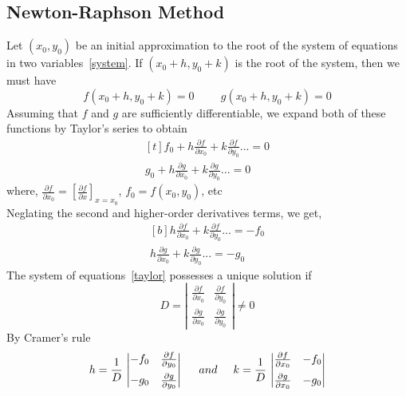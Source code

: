 \documentclass[aima203_lecturenotes_ku.tex]{subfiles}
\begin{document}
\subsection{Newton-Raphson Method}
Let $(x_0,y_0)$ be an initial approximation to the root of the system of equations in two variables~\ref{system}. If $(x_0+h, y_0+k)$ is the root of the system, then we must have
\begin{equation*}
  f(x_0+h,y_0+k) = 0 \hspace{1cm} g(x_0+h,y_0+k) = 0
\end{equation*}
Assuming that $f$ and $g$ are sufficiently differentiable, we expand both of these functions by Taylor's series to obtain
\begin{equation*}
  \begin{gathered}[t]
    f_0 +h\frac{\partial f}{\partial x_0} + k\frac{\partial f}{\partial y_0}... = 0 \\
    g_0 +h\frac{\partial g}{\partial x_0} + k\frac{\partial g}{\partial y_0}... = 0
  \end{gathered}
\end{equation*}
where, \hspace{5mm} $\displaystyle \frac{\partial f}{\partial x_0} = \left [\frac{\partial f}{\partial x} \right ] _{x=x_0}$, $f_0 = f(x_0,y_0)$, etc \\[1mm]
Neglating the second and higher-order derivatives terms, we get,
\begin{equation}
  \label{taylor}
  \begin{gathered}[b]
    h\frac{\partial f}{\partial x_0} + k\frac{\partial f}{\partial y_0}... = -f_0 \\
     h\frac{\partial g}{\partial x_0} + k\frac{\partial g}{\partial y_0}... = -g_0
  \end{gathered}
\end{equation}
The system of equations~\ref{taylor} possesses a unique solution if
$$ D =
\left \vert \begin{matrix}
  \frac{\partial f}{\partial x_0}  & \frac{\partial f}{\partial y_0} \\[2mm]
  \frac{\partial g}{\partial x_0}  & \frac{\partial g}{\partial y_0}
\end{matrix} \right \vert  \neq 0
$$
By Cramer's rule
\begin{equation}
  h= \frac{1}{D}\, \left \vert \begin{matrix}
  -f_0  & \frac{\partial f}{\partial y_0} \\[2mm]
  -g_0  & \frac{\partial g}{\partial y_0}
\end{matrix} \right \vert \hspace{5mm} and \hspace{5mm} k= \frac{1}{D}\, \left \vert \begin{matrix}
  \frac{\partial f}{\partial x_0} & -f_0  \\[2mm]
 \frac{\partial g}{\partial x_0} &  -g_0
\end{matrix} \right \vert
\end{equation}
\end{document}
